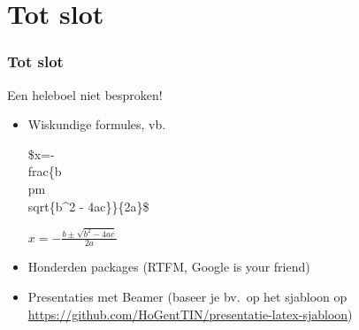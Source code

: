 \documentclass[aspectratio=169]{beamer}
\begin{document}
\section{Tot slot}

\begin{frame}[fragile]
 \frametitle{Tot slot}

  Een heleboel niet besproken!

  \begin{itemize}
    \item<+-> Wiskundige formules, vb.
    \begin{semiverbatim}
      \$x=-\\frac\{b \\pm \\sqrt\{b\^{}2 - 4ac\}\}\{2a\}\$
    \end{semiverbatim}
    \(x=-\frac{b \pm \sqrt{b^2 - 4ac}}{2a}\)
    \item<+-> Honderden packages (RTFM, Google is your friend)
    \item<+-> Presentaties met Beamer (baseer je bv.\ op het sjabloon op \url{https://github.com/HoGentTIN/presentatie-latex-sjabloon})

  \end{itemize}
\end{frame}
\end{document}
